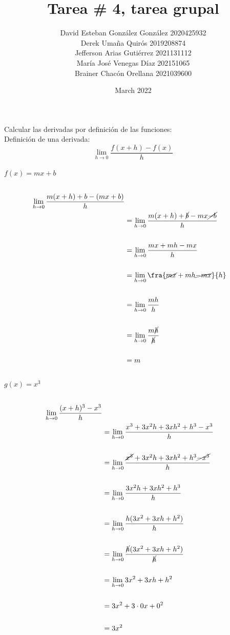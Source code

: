 \documentclass{article}
\title{Tarea \# 4, tarea grupal}
\author{David Esteban González González 2020425932\\Derek Umaña Quirós
2019208874\\Jefferson Arias Gutiérrez 2021131112\\María José Venegas Díaz 
202151065\\Brainer Chacón Orellana 2021039600}
\date{March 2022}
\begin{document}
\maketitle
Calcular las derivadas por definición de las funciones:\\
    Definición de una derivada:\\
\medium
\begin{equation*}
    \lim_{h\to 0} \frac{f(x+h)-f(x)}{h}
\end{equation*}
\\
$f(x) = mx+b$
\begin{equation*} \label{eq1}
\begin{split}
 \\\lim_{h\to 0} \frac{m(x+h)+b-(mx+b)}{h}\\
     &=\lim_{h\to 0}\frac{m(x+h)+\cancel{b}-mx\cancel{-b}}{h}\\
     \\
     &=\lim_{h\to 0}\frac{mx+mh-mx}{h}\\
     \\
     &=\lim_{h\to 0}\fra{\cancel{mx}+mh\cancel{-mx}}{h}\\
     \\
      &=\lim_{h\to 0}\frac{mh}{h}\\
      \\
     &=\lim_{h\to 0}\frac{m\cancel{h}}{\cancel{h}}\\
     \\
     &=m
\end{split}
\end{equation*}
\\
$g(x) = x^3$
\begin{equation*} \label{eq1}
\begin{split}
 \\\lim_{h\to 0} \frac{(x+h)^3-x^3}{h}\\
     &=\lim_{h\to 0}\frac{x^3+3x^2h+3xh^2+h^3-x^3}{h}\\
     \\
     &=\lim_{h\to 0}\frac{\cancel{x^3}+3x^2h+3xh^2+h^3\cancel{-x^3}}{h}\\
     \\
     &=\lim_{h\to 0}\frac{3x^2h+3xh^2+h^3}{h}\\
     \\
     &=\lim_{h\to 0}\frac{h(3x^2+3xh+h^2)}{h}\\
     \\
     &=\lim_{h\to 0}\frac{\cancel{h}(3x^2+3xh+h^2)}{\cancel{h}}\\
     \\
     &=\lim_{h\to 0}3x^2+3xh+h^2\\
     \\
     &=3x^2+3\cdot0x+0^2\\
     \\
     &=3x^2\\
\end{split}
\end{equation*}
\end{document}
